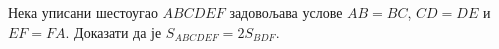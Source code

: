 \problem
Нека уписани шестоугао $ABCDEF$ задовољава услове $AB = BC$, $CD = DE$ и
$EF = FA$.
Доказати да је $S_{ABCDEF} = 2 S_{BDF}$.

\solution

\endproblem

